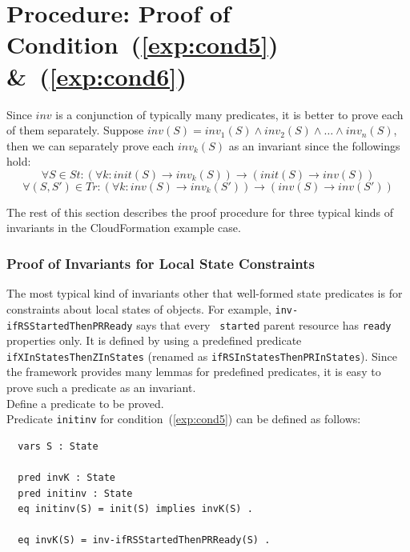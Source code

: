 \documentclass[12pt]{report}
\newcommand{\ra}{\rightarrow}
\begin{document}
\section{Procedure: Proof of Condition~(\ref{exp:cond5}) \&~(\ref{exp:cond6})}
\label{sec:invariant}
Since $inv$ is a conjunction of typically many predicates, it is
better to prove each of them separately. Suppose $inv(S) =
inv_1(S)\land inv_2(S)\land\dots\land inv_n(S)$, then we can
separately prove each $inv_k(S)$ as an invariant since the followings
hold:
\[\forall S\in St: (\forall k:init(S)\ra inv_k(S))\ra(init(S)\ra inv(S))\]
\[\forall (S,S')\in Tr: (\forall k:inv(S)\ra inv_k(S'))\ra(inv(S)\ra inv(S'))\]

\vspace{0.3cm}
The rest of this section describes the proof procedure for three
typical kinds of invariants in the CloudFormation example case.

\subsubsection*{Proof of Invariants for Local State Constraints}
The most typical kind of invariants other that well-formed state
predicates is for constraints about local states of objects.  For
example, {\tt inv-ifRSStartedThenPRReady} says that every {\tt
  started} parent resource has {\tt ready} properties only.  It is
defined by using a predefined predicate {\tt ifXInStatesThenZInStates}
(renamed as {\tt ifRSInStatesThenPRInStates}). Since the framework
provides many lemmas for predefined predicates, it is easy to
prove such a predicate as an invariant. \\

 Define a predicate to be proved. \\ Predicate
         {\tt initinv} for condition~(\ref{exp:cond5}) can be defined
         as follows:
\small
\begin{verbatim}
  vars S : State

  pred invK : State
  pred initinv : State
  eq initinv(S) = init(S) implies invK(S) .

  eq invK(S) = inv-ifRSStartedThenPRReady(S) .
\end{verbatim}
\normalsize
\end{document}
